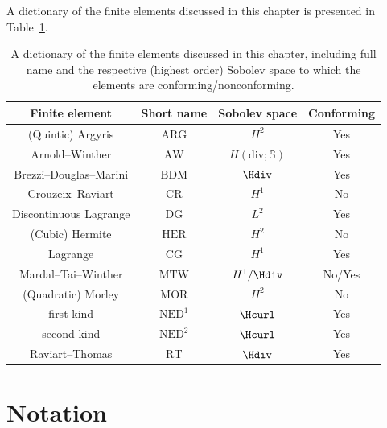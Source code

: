 A dictionary of the finite elements discussed in this chapter is
presented in Table~\ref{kirby-6:tab:overview}.
\begin{table}
  \begin{center}
    \begin{tabular}{|c|c|c|c|}
      \toprule
      Finite element & Short name & Sobolev space & Conforming\\
      \midrule
      (Quintic) Argyris & $\mathrm{ARG}$ & $H^2$ &Yes \\
      Arnold--Winther & $\mathrm{AW}$ & $H(\mathrm{div}; \mathbb{S})$ &Yes \\
      Brezzi--Douglas--Marini & $\mathrm{BDM}$ & $\Hdiv$ & Yes \\
      Crouzeix--Raviart & $\mathrm{CR}$ & $H^1$ & No \\
      Discontinuous Lagrange & $\mathrm{DG}$ & $L^2$ & Yes \\
      (Cubic) Hermite & $\mathrm{HER}$ & $H^2$ & No \\
      Lagrange & $\mathrm{CG}$ & $H^1$ & Yes \\
      Mardal--Tai--Winther & $\mathrm{MTW}$ & $H^1/\Hdiv$ & No/Yes \\
      (Quadratic) Morley & $\mathrm{MOR}$ & $H^2$ & No \\
      \nedelec{} first kind & $\mathrm{NED^1}$ & $\Hcurl$ & Yes \\
      \nedelec{} second kind & $\mathrm{NED^2}$ & $\Hcurl$ & Yes \\
      Raviart--Thomas & $\mathrm{RT}$ & $\Hdiv$ & Yes \\
      \bottomrule
    \end{tabular}
  \end{center}
  \caption{A dictionary of the finite elements discussed in this
    chapter, including full name and the respective (highest order)
    Sobolev space to which the elements are conforming/nonconforming.}
  \label{kirby-6:tab:overview}
\end{table}

\section{Notation}

